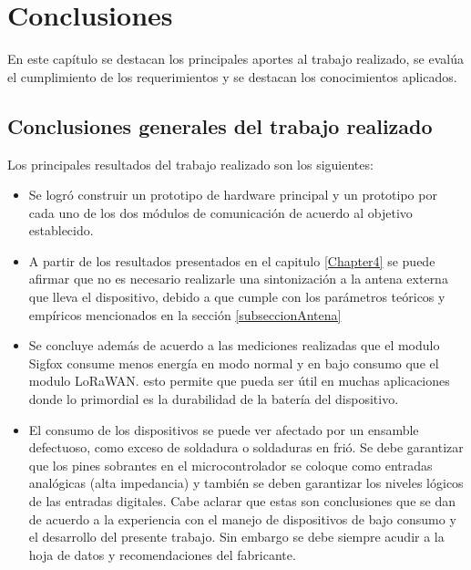 
\chapter{Conclusiones} %

\label{Chapter5} %



En este capítulo se destacan los principales aportes al trabajo realizado, se evalúa el cumplimiento de los requerimientos y se destacan los conocimientos aplicados.
\section{Conclusiones generales del trabajo realizado}


Los principales resultados del trabajo realizado son los siguientes:

\begin{itemize}
    \item Se logró construir un prototipo de hardware principal y un prototipo por cada uno de los dos módulos de comunicación de acuerdo al objetivo establecido.
    \item A partir de los resultados presentados en el capitulo \ref{Chapter4} se puede afirmar que no es necesario realizarle una sintonización a la antena externa que lleva el dispositivo, debido a que cumple con los parámetros teóricos y empíricos mencionados en la sección \ref{subseccionAntena}
\end{itemize}


\begin{itemize}
    \item Se concluye además de acuerdo a las mediciones realizadas que el modulo Sigfox consume menos energía en modo normal y en bajo consumo que el modulo LoRaWAN. esto permite que pueda ser útil en muchas aplicaciones donde lo primordial es la durabilidad de la batería del dispositivo.
    \item El consumo de los dispositivos se puede ver afectado por un ensamble defectuoso, como exceso de soldadura o soldaduras en frió. Se debe garantizar que los pines sobrantes en el microcontrolador se coloque como entradas analógicas (alta impedancia) y también se deben garantizar los niveles lógicos de las entradas digitales. Cabe aclarar que estas son conclusiones que se dan de acuerdo a la experiencia con el manejo de dispositivos de bajo consumo y el desarrollo del presente trabajo. Sin embargo se debe siempre acudir a la hoja de datos y recomendaciones del fabricante.
\end{itemize}

